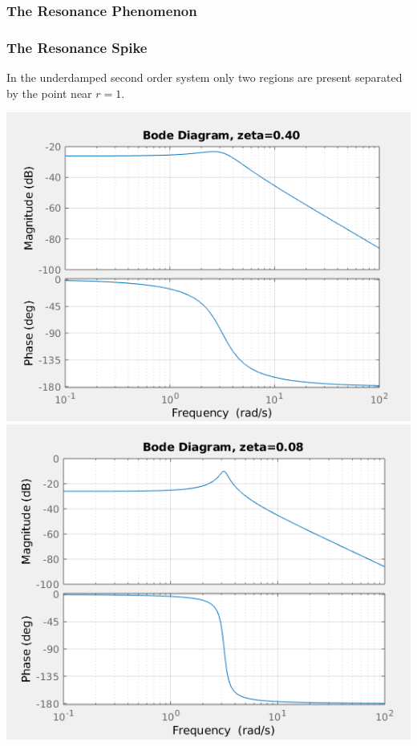 \documentclass[fleqn]{beamer} %
\newcommand{\sectionIVsubsectionIItitle}{The Resonance Phenomenon}
\begin{document}
			\begin{frame}
				\frametitle{\sectionIVsubsectionIItitle}
				\bigskip

				\frametitle{The Resonance Spike}

				In the underdamped second order system only two regions are present separated by the point near $r=1$. \vspc

				\includegraphics[scale=.18]{images/lecture4_fig1.png} 
				\includegraphics[scale=.18]{images/lecture4_fig2.png} 

\end{frame}
\end{document}
